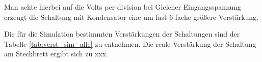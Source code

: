 \documentclass[12pt,english,ngerman]{scrartcl}
\begin{document}







Man achte hierbei auf die Volts per division bei Gleicher Eingangsspannung
erzeugt die Schaltung mit Kondensator eine um fast 6-fache größere Verstärkung.

Die für die Simulation bestimmten Verstärkungen der Schaltungen sind der
Tabelle \autoref{tab:verst_sim_alle} zu entnehmen. Die reale Verstärkung der Schaltung
am Steckbrett ergibt sich zu xxx.

\newpage

\printbibliography

\listoffigures

\listoftables
\end{document}
